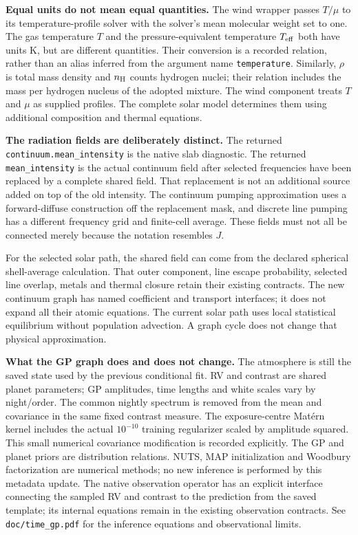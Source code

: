 \documentclass[10pt,a4paper]{article}
\begin{document}
\textbf{Equal units do not mean equal quantities.}
The wind wrapper passes $T/\mu$ to its temperature-profile solver with the
solver's mean molecular weight set to one. The gas temperature $T$ and the
pressure-equivalent temperature $T_{\rm eff}$ both have units K, but are
different quantities. Their conversion is a recorded relation, rather than
an alias inferred from the argument name \texttt{temperature}.
Similarly, $\rho$ is total mass density and $n_{\rm H}$ counts hydrogen nuclei;
their relation includes the mass per hydrogen nucleus of the adopted mixture.
The wind component treats $T$ and $\mu$ as supplied profiles. The complete
solar model determines them using additional composition and thermal equations.

\textbf{The radiation fields are deliberately distinct.}
The returned \texttt{continuum.mean\_intensity} is the native slab diagnostic.
The returned \texttt{mean\_intensity} is the actual continuum field after
selected frequencies have been replaced by a complete shared field. That
replacement is not an additional source added on top of the old intensity.
The continuum pumping approximation uses a forward-diffuse construction
off the replacement mask, and discrete line pumping has a different frequency
grid and finite-cell average. These fields must not all be connected merely
because the notation resembles $J$.

For the selected solar path, the shared field can come from the declared
spherical shell-average calculation. That outer component, line escape
probability, selected line overlap, metals and thermal closure retain their
existing contracts. The new continuum graph has named coefficient and
transport interfaces; it does not expand all their atomic equations.
The current solar path uses local statistical equilibrium without population
advection. A graph cycle does not change that physical approximation.

\newpage
\textbf{What the GP graph does and does not change.}
The atmosphere is still the saved state used by the previous conditional fit.
RV and contrast are shared planet parameters; GP amplitudes, time lengths
and white scales vary by night/order. The common nightly spectrum is removed
from the mean and covariance in the same fixed contrast measure.
The exposure-centre Mat\'ern kernel includes the actual $10^{-10}$ training
regularizer scaled by amplitude squared. This small numerical covariance
modification is recorded explicitly. The GP and planet priors are distribution
relations. NUTS, MAP initialization and Woodbury factorization are numerical
methods; no new inference is performed by this metadata update.
The native observation operator has an explicit interface connecting the
sampled RV and contrast to the prediction from the saved template; its
internal equations remain in the existing observation contracts.
See \texttt{doc/time\_gp.pdf} for the inference equations and observational limits.
\end{document}
